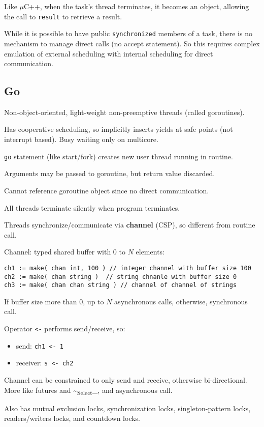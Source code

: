 \documentclass[11pt]{article}
\begin{document}
Like \(\mu\)C++, when the task's thread terminates, it becomes an object,
allowing the call to \texttt{result} to retrieve a result.

While it is possible to have public \texttt{synchronized} members of a task,
there is no mechanism to manage direct calls (no accept statement).
So this requires complex emulation of external scheduling with internal scheduling
for direct communication.
\subsection{Go}
\label{sec:org74e0409}
Non-object-oriented, light-weight non-preemptive threads (called goroutines).

Has cooperative scheduling, so implicitly inserts yields at safe points
(not interrupt based).
Busy waiting only on multicore.

\texttt{go} statement (like start/fork) creates new user thread running in routine.

Arguments may be passed to goroutine, but return value discarded.

Cannot reference goroutine object since no direct communication.

All threads terminate silently when program terminates.

Threads synchronize/communicate via \textbf{channel} (CSP), so different from
routine call.

Channel: typed shared buffer with 0 to \(N\) elements:
\begin{verbatim}
ch1 := make( chan int, 100 ) // integer channel with buffer size 100
ch2 := make( chan string )  // string chnanle with buffer size 0
ch3 := make( chan chan string ) // channel of channel of strings
\end{verbatim}

If buffer size more than 0, up to \(N\) asynchronous calls, otherwise,
synchronous call.

Operator \texttt{<-} performs send/receive, so:
\begin{itemize}
\item send: \texttt{ch1 <- 1}
\item receiver: \texttt{s <- ch2}
\end{itemize}

Channel can be constrained to only send and receive, otherwise bi-directional.
More like futures and \textasciitilde{}\textsubscript{Select}\_, and asynchronous call.

Also has mutual exclusion locks, synchronization locks,
singleton-pattern locks, readers/writers locks, and countdown locks.
\end{document}
